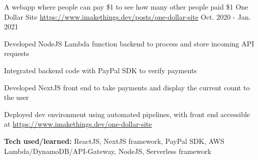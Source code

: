 \begin{cventries}
    \vspace{-.25em}
    \cventry
    {A webapp where people can pay \$1 to see how many other people paid \$1} %
    {One Dollar Site} %
    {\href{https://www.imakethings.dev/posts/one-dollar-site}{https://www.imakethings.dev/posts/one-dollar-site}} %
    {Oct. 2020 - Jan. 2021} %
    { %
        \begin{cvitems}
            \item {Developed NodeJS Lambda function backend to process and store incoming API requests}
            \item {Integrated backend code with PayPal SDK to verify payments}
            \item {Developed NextJS front end to take payments and display the current count to the user}
            \item {Deployed dev environment using automated pipelines, with front end accessible at \href{https://www.imakethings.dev/one-dollar-site}{https://www.imakethings.dev/one-dollar-site}}
            \item {\textbf{Tech used/learned:} ReactJS, NextJS framework, PayPal SDK, AWS Lambda/DynamoDB/API-Gateway, NodeJS, Serverless framework}
        \end{cvitems}
    }




\end{cventries}
